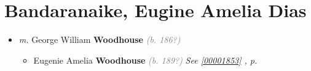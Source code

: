 \documentclass[10pt, openany]{book}
\begin{document}
\chapter{Bandaranaike, Eugine Amelia Dias}
\label{00001851}
\textcolor{slmaroon}{\textit{}}
\begin{itemize}
\item{\textit{m.} George William \textbf{Woodhouse} \textcolor{gray}{\textit{(b. 186?)}}   \label{couple:00001851:00001852} \begin{itemize}
\item{Eugenie Amelia \textbf{Woodhouse} \textcolor{gray}{\textit{(b. 189?)}} \textcolor{slteal}{\textit{See  \autoref{00001853} \textit{, p. \pageref{00001853} }}}}
\end{itemize}}
\end{itemize}
   
\end{document}
